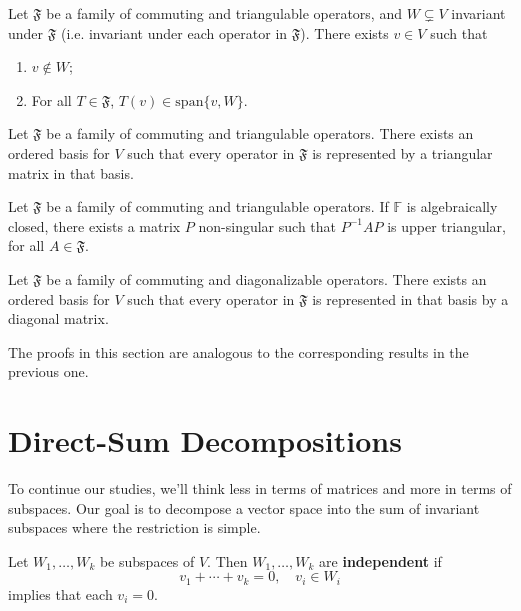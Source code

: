 \begin{lemma}
	Let $\mathfrak{F}$ be a family of commuting and triangulable operators, and $W \subsetneq V$ invariant under $\mathfrak{F}$ (i.e. invariant under each operator in $\mathfrak{F}$). There exists $v \in V$ such that
	\begin{enumerate}
		\item $v \notin W$;
		\item For all $T \in \mathfrak{F}$, $T(v) \in \text{span}\{ v, W \}$.
	\end{enumerate}
\end{lemma}

\begin{theorem}
	Let $\mathfrak{F}$ be a family of commuting and triangulable operators. There exists an ordered basis for $V$ such that every operator in $\mathfrak{F}$ is represented by a triangular matrix in that basis.
\end{theorem}

\begin{corollary}
	Let $\mathfrak{F}$ be a family of commuting and triangulable operators. If $\mathbb{F}$ is algebraically closed, there exists a matrix $P$ non-singular such that $P^{-1} A P$ is upper triangular, for all $A \in \mathfrak{F}$.
\end{corollary}

\begin{theorem}
	Let $\mathfrak{F}$ be a family of commuting and diagonalizable operators. There exists an ordered basis for $V$ such that every operator in $\mathfrak{F}$ is represented in that basis by a diagonal matrix.
\end{theorem}

The proofs in this section are analogous to the corresponding results in the previous one.

\section{Direct-Sum Decompositions}

To continue our studies, we'll think less in terms of matrices and more in terms of subspaces. Our goal is to decompose a vector space into the sum of invariant subspaces where the restriction is simple.

\begin{definition}
	Let $W_1, \ldots, W_k$ be subspaces of $V$. Then $W_1, \ldots, W_k$ are \textbf{independent} if 
	\[
		v_1 + \cdots + v_k = 0, \quad v_i \in W_i
	\]
	implies that each $v_i = 0$.
\end{definition}

